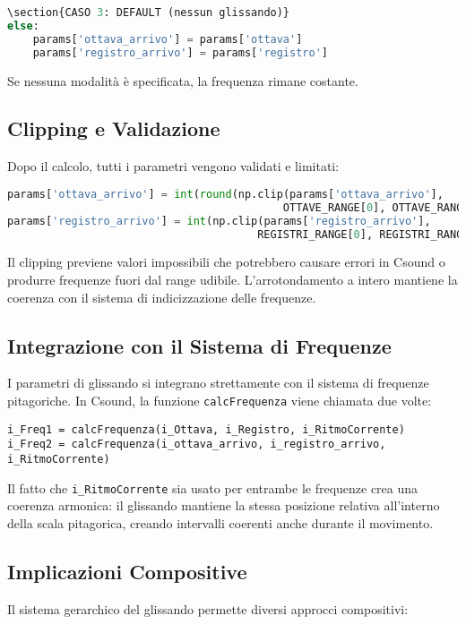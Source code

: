 \begin{lstlisting}[language=Python]
\section{CASO 3: DEFAULT (nessun glissando)}
else:
    params['ottava_arrivo'] = params['ottava']
    params['registro_arrivo'] = params['registro']
\end{lstlisting}

Se nessuna modalità è specificata, la frequenza rimane costante.
\subsection{Clipping e Validazione}
Dopo il calcolo, tutti i parametri vengono validati e limitati:

\begin{lstlisting}[language=Python]
params['ottava_arrivo'] = int(round(np.clip(params['ottava_arrivo'], 
                                           OTTAVE_RANGE[0], OTTAVE_RANGE[1])))
params['registro_arrivo'] = int(np.clip(params['registro_arrivo'], 
                                       REGISTRI_RANGE[0], REGISTRI_RANGE[1]))
\end{lstlisting}

Il clipping previene valori impossibili che potrebbero causare errori in Csound o produrre frequenze fuori dal range udibile. L'arrotondamento a intero mantiene la coerenza con il sistema di indicizzazione delle frequenze.
\subsection{Integrazione con il Sistema di Frequenze}
I parametri di glissando si integrano strettamente con il sistema di frequenze pitagoriche. In Csound, la funzione \texttt{calcFrequenza} viene chiamata due volte:

\begin{lstlisting}[language=Csound]
i_Freq1 = calcFrequenza(i_Ottava, i_Registro, i_RitmoCorrente)
i_Freq2 = calcFrequenza(i_ottava_arrivo, i_registro_arrivo, i_RitmoCorrente)
\end{lstlisting}

Il fatto che \texttt{i\_RitmoCorrente} sia usato per entrambe le frequenze crea una coerenza armonica: il glissando mantiene la stessa posizione relativa all'interno della scala pitagorica, creando intervalli coerenti anche durante il movimento.
\subsection{Implicazioni Compositive}
Il sistema gerarchico del glissando permette diversi approcci compositivi:


